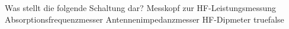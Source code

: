     {Was stellt die folgende Schaltung dar? }
    {Messkopf zur HF-Leistungsmessung}
    {Absorptionsfrequenzmesser}
    {Antennenimpedanzmesser}
    {HF-Dipmeter}
    {true}{false}